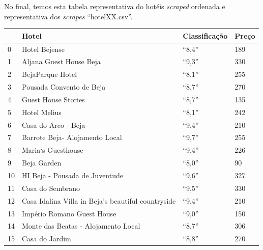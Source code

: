 \documentclass[a4paper,10pt]{article}
\begin{document}
No final, temos esta tabela representativa do hotéis \textit{scraped} ordenada e representativa dos \textit{scrapes} ``hotelXX.csv''.

\begin{table}[!ht]
  \centering
  \begin{tabular}{|l|l|l|l|}
    \hline
    ~  & Hotel                                              & Classificação & Preço \\ \hline
    0  & Hotel Bejense                                      & ``8,4''       & 189   \\ \hline
    1  & Aljana Guest House Beja                            & ``9,3''       & 330   \\ \hline
    2  & BejaParque Hotel                                   & ``8,1''       & 255   \\ \hline
    3  & Pousada Convento de Beja                           & ``8,7''       & 270   \\ \hline
    4  & Guest House Stories                                & ``8,7''       & 135   \\ \hline
    5  & Hotel Melius                                       & ``8,1''       & 242   \\ \hline
    6  & Casa do Arco - Beja                                & ``9,4''       & 210   \\ \hline
    7  & Barrote Beja- Alojamento Local                     & ``9,7''       & 255   \\ \hline
    8  & Maria`s Guesthouse                                 & ``9,4''       & 226   \\ \hline
    9  & Beja Garden                                        & ``8,0''       & 90    \\ \hline
    10 & HI Beja - Pousada de Juventude                     & ``9,6''       & 327   \\ \hline
    11 & Casa do Sembrano                                   & ``9,5''       & 330   \\ \hline
    12 & Casa Idalina Villa in Beja's beautiful countryside & ``9,4''       & 210   \\ \hline
    13 & Império Romano Guest House                         & ``9,0''       & 150   \\ \hline
    14 & Monte das Beatas - Alojamento Local                & ``8,7''       & 306   \\ \hline
    15 & Casa do Jardim                                     & ``8,8''       & 270   \\ \hline

\end{tabular}
\end{table}
\end{document}
